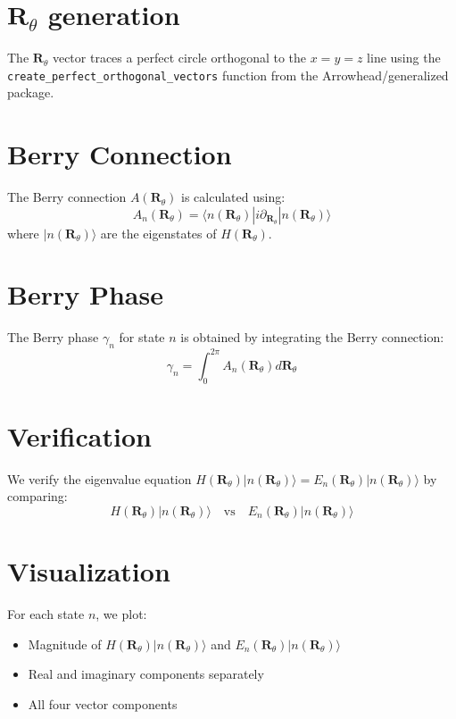 \documentclass{article}
\begin{document}
\section{$\bm{R}_{\theta}$ generation}
The $\bm{R}_{\theta}$ vector traces a perfect circle orthogonal to the $x=y=z$ line using the \texttt{create\_perfect\_orthogonal\_vectors} function from the Arrowhead/generalized package.


\section{Berry Connection}
The Berry connection $A(\bm{R}_{\theta})$ is calculated using:
\begin{equation}
A_{n}(\bm{R}_{\theta}) = \langle n(\bm{R}_{\theta}) | i \partial_{\bm{R}_{\theta}} | n(\bm{R}_{\theta}) \rangle
\end{equation}
where $|n(\bm{R}_{\theta})\rangle$ are the eigenstates of $H(\bm{R}_{\theta})$.

\section{Berry Phase}
The Berry phase $\gamma_n$ for state $n$ is obtained by integrating the Berry connection:
\begin{equation}
\gamma_n = \int_0^{2\pi} A_n(\bm{R}_{\theta}) d\bm{R}_{\theta}
\end{equation}

\section{Verification}
We verify the eigenvalue equation $H(\bm{R}_{\theta})|n(\bm{R}_{\theta})\rangle = E_n(\bm{R}_{\theta})|n(\bm{R}_{\theta})\rangle$ by comparing:
\begin{equation}
H(\bm{R}_{\theta})|n(\bm{R}_{\theta})\rangle \quad \text{vs} \quad E_n(\bm{R}_{\theta})|n(\bm{R}_{\theta})\rangle
\end{equation}

\section{Visualization}
For each state $n$, we plot:
\begin{itemize}
\item Magnitude of $H(\bm{R}_{\theta})|n(\bm{R}_{\theta})\rangle$ and $E_n(\bm{R}_{\theta})|n(\bm{R}_{\theta})\rangle$
\item Real and imaginary components separately
\item All four vector components
\end{itemize}
\end{document}

